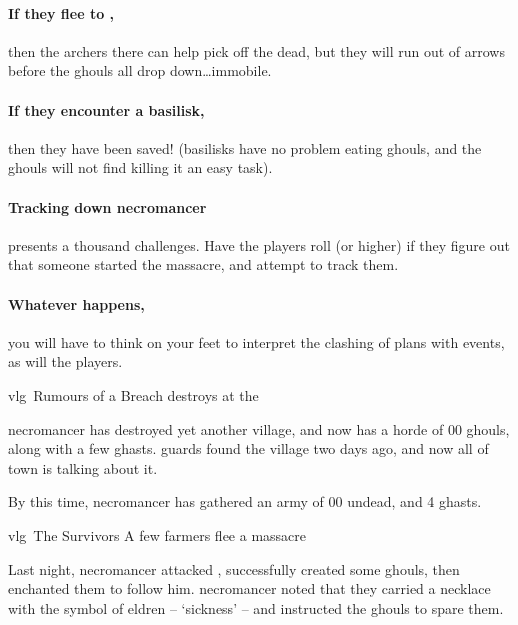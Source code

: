 \paragraph{If they flee to ,}
then the archers there can help pick off the dead, but they will run out of arrows before the ghouls all drop down\ldots immobile.

\paragraph{If they encounter a basilisk,}
then they have been saved!
(basilisks have no problem eating ghouls, and the ghouls will not find killing it an easy task).

\paragraph{Tracking down \gls{necromancer}}
presents a thousand challenges.
Have the players roll  (\tn[14] or higher) if they figure out that someone started the massacre, and attempt to track them.

\paragraph{Whatever happens,}
you will have to think on your feet to interpret the clashing of plans with events, as will the players.

{\gls{vlg}~\squash Rumours of a Breach}%
{ destroys  at the }%
\label{necroRumours}

\Gls{necromancer} has destroyed yet another \gls{village}, and now has a horde of 00 ghouls, along with a few ghasts.
\Glspl{guard} found the \gls{village} two days ago, and now all of \gls{town} is talking about it.

By this time, \gls{necromancer} has gathered an army of 00 undead, and 4 ghasts.

{\gls{vlg}~The Survivors}%
{A few farmers flee a massacre}%

\begin{exampletext}
  Last night, \gls{necromancer} attacked , successfully created some ghouls, then enchanted them to follow him.
  \Gls{necromancer} noted that they carried a necklace with the symbol of \gls{eldren} -- `\gls{sickness}' -- and instructed the ghouls to spare them.
\end{exampletext}

